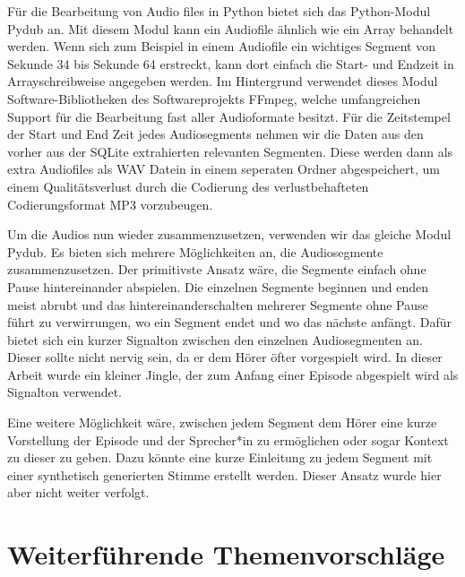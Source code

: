 Für die Bearbeitung von Audio files in Python bietet sich das Python-Modul Pydub an. 
Mit diesem Modul kann ein Audiofile ähnlich wie ein Array behandelt werden.
Wenn sich zum Beispiel in einem Audiofile ein wichtiges Segment von Sekunde 34 bis Sekunde 64 erstreckt,  kann dort einfach die Start- und Endzeit in Arrayschreibweise angegeben werden.
Im Hintergrund verwendet dieses Modul Software-Bibliotheken des Softwareprojekts FFmpeg, welche umfangreichen Support für die Bearbeitung fast aller Audioformate besitzt.\cite{ffmpeg}
Für die Zeitstempel der Start und End Zeit jedes Audiosegments nehmen wir die Daten aus den vorher aus der SQLite extrahierten relevanten Segmenten.
Diese werden dann als extra Audiofiles als WAV Datein in einem seperaten Ordner abgespeichert, um einem Qualitätsverlust durch die Codierung des verlustbehafteten Codierungsformat MP3 vorzubeugen.

Um die Audios nun wieder zusammenzusetzen, verwenden wir das gleiche Modul Pydub. 
Es bieten sich mehrere Möglichkeiten an, die Audiosegmente zusammenzusetzen. 
Der primitivste Ansatz wäre, die Segmente einfach ohne Pause hintereinander abspielen. 
Die einzelnen Segmente beginnen und enden meist abrubt und das hintereinanderschalten mehrerer Segmente ohne Pause führt zu verwirrungen, wo ein Segment endet und wo das nächste anfängt.
Dafür bietet sich ein kurzer Signalton zwischen den einzelnen Audiosegmenten an. 
Dieser sollte nicht nervig sein, da er dem Hörer öfter vorgespielt wird. 
In dieser Arbeit wurde ein kleiner Jingle, der zum Anfang einer Episode abgespielt wird als Signalton verwendet.

Eine weitere Möglichkeit wäre, zwischen jedem Segment dem Hörer eine kurze Vorstellung der Episode und der Sprecher*in zu ermöglichen oder sogar Kontext zu dieser zu geben. 
Dazu könnte eine kurze Einleitung zu jedem Segment mit einer synthetisch generierten Stimme erstellt werden.
Dieser Ansatz wurde hier aber nicht weiter verfolgt.

\section{Weiterführende Themenvorschläge}

